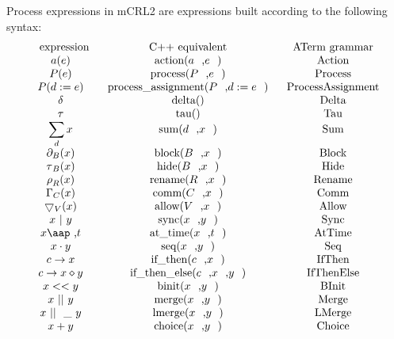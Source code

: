 \documentclass{article}
\begin{document}
Process expressions in mCRL2 are expressions built according to the
following syntax:%
\[
\begin{array}{ccc}
\text{expression} & \text{C++ equivalent} & \text{ATerm grammar} \\ 
a(e) & \text{action(}a\text{,}e\text{)} & \text{Action} \\ 
P(e) & \text{process(}P\text{,}e\text{)} & \text{Process} \\ 
P(d:=e) & \text{process\_assignment(}P\text{,}d:=e\text{)} & \text{%
ProcessAssignment} \\ 
\delta & \text{delta()} & \text{Delta} \\ 
\tau & \text{tau()} & \text{Tau} \\ 
\dsum\limits_{d}x & \text{sum(}d\text{,}x\text{)} & \text{Sum} \\ 
\partial _{B}(x) & \text{block(}B\text{,}x\text{)} & \text{Block} \\ 
\tau _{B}(x) & \text{hide(}B\text{,}x\text{)} & \text{Hide} \\ 
\rho _{R}(x) & \text{rename(}R\text{,}x\text{)} & \text{Rename} \\ 
\Gamma _{C}(x) & \text{comm(}C\text{,}x\text{)} & \text{Comm} \\ 
\bigtriangledown _{V}(x) & \text{allow(}V\text{,}x\text{)} & \text{Allow} \\ 
x\ |\ y & \text{sync(}x\text{,}y\text{)} & \text{Sync} \\ 
x\mbox{\aap ,}t & \text{at\_time(}x\text{,}t\text{)} & \text{AtTime} \\ 
x\cdot y & \text{seq(}x\text{,}y\text{)} & \text{Seq} \\ 
c\rightarrow x & \text{if\_then(}c\text{,}x\text{)} & \text{IfThen} \\ 
c\rightarrow x\diamond y & \text{if\_then\_else(}c\text{,}x\text{,}y\text{)}
& \text{IfThenElse} \\ 
x<<y & \text{binit(}x\text{,}y\text{)} & \text{BInit} \\ 
x\ ||\ y & \text{merge(}x\text{,}y\text{)} & \text{Merge} \\ 
x\ ||\_\ y & \text{lmerge(}x\text{,}y\text{)} & \text{LMerge} \\ 
x+y & \text{choice(}x\text{,}y\text{)} & \text{Choice}%
\end{array}%
\]
\end{document}
